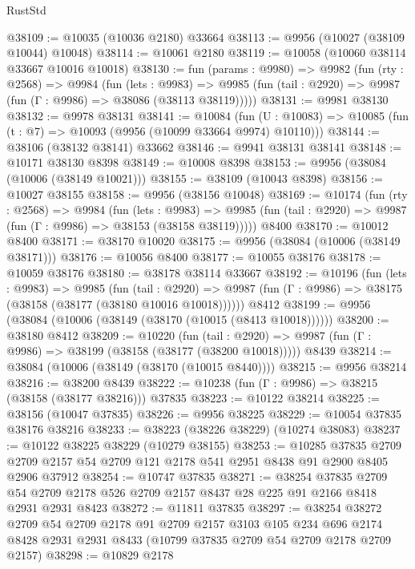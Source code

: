 \begin{lexlean}{RustStd}
\begin{coremodule}
@38109 := @10035 (@10036 @2180) @33664
@38113 := @9956 (@10027 (@38109 @10044) @10048)
@38114 := @10061 @2180
@38119 := @10058 (@10060 @38114 @33667 @10016 @10018)
@38130 := fun (params : @9980) =>
  @9982
    (fun (rty : @2568) =>
    @9984
      (fun (lets : @9983) =>
      @9985 (fun (tail : @2920) => @9987 (fun (Γ : @9986) => @38086 (@38113 @38119)))))
@38131 := @9981 @38130
@38132 := @9978 @38131
@38141 := @10084
    (fun (U : @10083) => @10085 (fun (t : @7) => @10093 (@9956 (@10099 @33664 @9974) @10110)))
@38144 := @38106 (@38132 @38141) @33662
@38146 := @9941 @38131 @38141
@38148 := @10171 @38130 @8398
@38149 := @10008 @8398
@38153 := @9956 (@38084 (@10006 (@38149 @10021)))
@38155 := @38109 (@10043 @8398)
@38156 := @10027 @38155
@38158 := @9956 (@38156 @10048)
@38169 := @10174
    (fun (rty : @2568) =>
    @9984
      (fun (lets : @9983) =>
      @9985 (fun (tail : @2920) => @9987 (fun (Γ : @9986) => @38153 (@38158 @38119)))))
    @8400
@38170 := @10012 @8400
@38171 := @38170 @10020
@38175 := @9956 (@38084 (@10006 (@38149 @38171)))
@38176 := @10056 @8400
@38177 := @10055 @38176
@38178 := @10059 @38176
@38180 := @38178 @38114 @33667
@38192 := @10196
    (fun (lets : @9983) =>
    @9985
      (fun (tail : @2920) =>
      @9987 (fun (Γ : @9986) => @38175 (@38158 (@38177 (@38180 @10016 @10018))))))
    @8412
@38199 := @9956 (@38084 (@10006 (@38149 (@38170 (@10015 (@8413 @10018))))))
@38200 := @38180 @8412
@38209 := @10220
    (fun (tail : @2920) => @9987 (fun (Γ : @9986) => @38199 (@38158 (@38177 (@38200 @10018)))))
    @8439
@38214 := @38084 (@10006 (@38149 (@38170 (@10015 @8440))))
@38215 := @9956 @38214
@38216 := @38200 @8439
@38222 := @10238 (fun (Γ : @9986) => @38215 (@38158 (@38177 @38216))) @37835
@38223 := @10122 @38214
@38225 := @38156 (@10047 @37835)
@38226 := @9956 @38225
@38229 := @10054 @37835 @38176 @38216
@38233 := @38223 (@38226 @38229) (@10274 @38083)
@38237 := @10122 @38225 @38229 (@10279 @38155)
@38253 := @10285
    @37835
    @2709
    @2709
    @2157
    @54
    @2709
    @121
    @2178
    @541
    @2951
    @8438
    @91
    @2900
    @8405
    @2906
    @37912
@38254 := @10747 @37835
@38271 := @38254
    @37835
    @2709
    @54
    @2709
    @2178
    @526
    @2709
    @2157
    @8437
    @28
    @225
    @91
    @2166
    @8418
    @2931
    @2931
    @8423
@38272 := @11811 @37835
@38297 := @38254
    @38272
    @2709
    @54
    @2709
    @2178
    @91
    @2709
    @2157
    @3103
    @105
    @234
    @696
    @2174
    @8428
    @2931
    @2931
    @8433
    (@10799 @37835 @2709 @54 @2709 @2178 @2709 @2157)
@38298 := @10829 @2178

\end{coremodule}
\end{lexlean}
